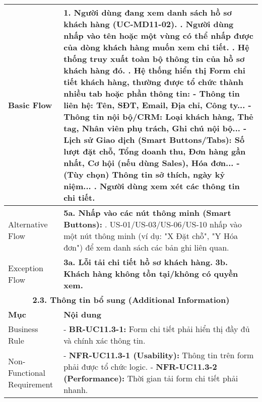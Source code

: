 \begin{longtable}{|m{4cm}|p{11cm}|}
Basic Flow & 1. Người dùng đang xem danh sách hồ sơ khách hàng (UC-MD11-02). \newline 2. Người dùng nhấp vào tên hoặc một vùng có thể nhấp được của dòng khách hàng muốn xem chi tiết. \newline 3. Hệ thống truy xuất toàn bộ thông tin của hồ sơ khách hàng đó. \newline 4. Hệ thống hiển thị Form chi tiết khách hàng, thường được tổ chức thành nhiều tab hoặc phần thông tin: \newline    - \textbf{Thông tin liên hệ:} Tên, SĐT, Email, Địa chỉ, Công ty... \newline    - \textbf{Thông tin nội bộ/CRM:} Loại khách hàng, Thẻ tag, Nhân viên phụ trách, Ghi chú nội bộ... \newline    - \textbf{Lịch sử Giao dịch (Smart Buttons/Tabs):} Số lượt đặt chỗ, Tổng doanh thu, Đơn hàng gần nhất, Cơ hội (nếu dùng Sales), Hóa đơn... \newline    - (Tùy chọn) Thông tin sở thích, ngày kỷ niệm... \newline 5. Người dùng xem xét các thông tin chi tiết. \\
\hline
Alternative Flow & \textbf{5a. Nhấp vào các nút thông minh (Smart Buttons):} \newline    1. US-01/US-03/US-06/US-10 nhấp vào một nút thông minh (ví dụ: "X Đặt chỗ", "Y Hóa đơn") để xem danh sách các bản ghi liên quan. \\
\hline
Exception Flow & \textbf{3a. Lỗi tải chi tiết hồ sơ khách hàng.} \newline \textbf{3b. Khách hàng không tồn tại/không có quyền xem.} \\
\hline
\multicolumn{2}{|c|}{\textbf{2.3. Thông tin bổ sung (Additional Information)}} \\
\hline
\textbf{Mục} & \textbf{Nội dung} \\
\hline
Business Rule & - \textbf{BR-UC11.3-1:} Form chi tiết phải hiển thị đầy đủ và chính xác thông tin. \\
\hline
Non-Functional Requirement & - \textbf{NFR-UC11.3-1 (Usability):} Thông tin trên form phải được tổ chức logic. \newline - \textbf{NFR-UC11.3-2 (Performance):} Thời gian tải form chi tiết phải nhanh. \\
\hline
\end{longtable}

